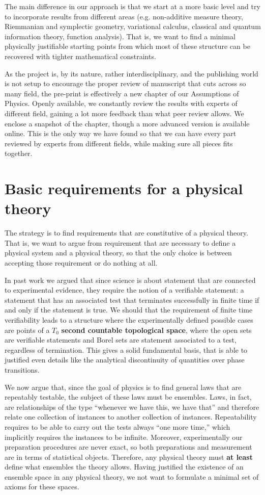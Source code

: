 \documentclass[10pt,twocolumn, nofootinbib]{revtex4-2}
\begin{document}
The main difference in our approach is that we start at a more basic level and try to incorporate results from different areas (e.g. non-additive measure theory, Riemmanian and symplectic geometry, variational calculus, classical and quantum information theory, function analysis). That is, we want to find a minimal physically justifiable starting points from which most of these structure can be recovered with tighter mathematical constraints.

As the project is, by its nature, rather interdisciplinary, and the publishing world is not setup to encourage the proper review of manuscript that cuts across so many field, the pre-print is effectively a new chapter of our Assumptions of Physics. Openly available, we constantly review the results with experts of different field, gaining a lot more feedback than what peer review allows. We enclose a snapshot of the chapter, though a more advanced version is available online. This is the only way we have found so that we can have every part reviewed by experts from different fields, while making sure all pieces fits together.

\section{Basic requirements for a physical theory}

The strategy is to find requirements that are constitutive of a physical theory. That is, we want to argue from requirement that are necessary to define a physical system and a physical theory, so that the only choice is between accepting those requirement or do nothing at all.

In past work we argued that since science is about statement that are connected to experimental evidence, they require the notion of a verifiable statement: a statement that has an associated test that terminates successfully in finite time if and only if the statement is true. We should that the requirement of finite time verifiability leads to a structure where the experimentally defined possible cases are points of a $T_0$ \textbf{second countable topological space}, where the open sets are verifiable statements and Borel sets are statement associated to a test, regardless of termination. This gives a solid fundamental basis, that is able to justified even details like the analytical discontinuity of quantities over phase transitions.

We now argue that, since the goal of physics is to find general laws that are repeatably testable, the subject of these laws must be ensembles. Laws, in fact, are relationships of the type ``whenever we have this, we have that'' and therefore relate one collection of instances to another collection of instances. Repeatability requires to be able to carry out the tests always ``one more time,'' which implicitly requires the instances to be infinite. Moreover, experimentally our preparation procedures are never exact, so both preparations and measurement are in terms of statistical objects. Therefore, any physical theory must \textbf{at least} define what ensembles the theory allows. Having justified the existence of an ensemble space in any physical theory, we not want to formulate a minimal set of axioms for these spaces.
\end{document}
